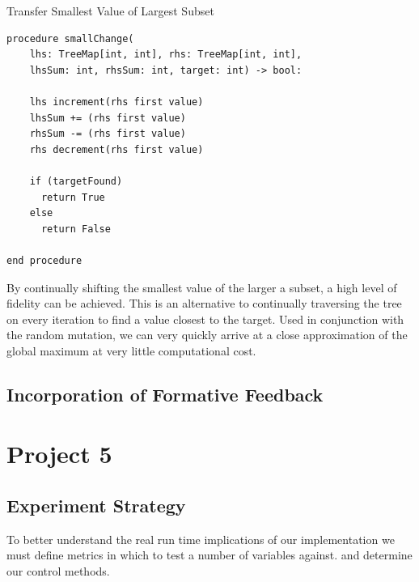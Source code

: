 \documentclass[a4paper]{article}
\begin{document}
\makeatletter
\renewcommand{\ALG@name}{Small Change}
\makeatother
\setcounter{algorithm}{0}


\begin{algorithm}
\caption{Transfer Smallest Value of Largest Subset}\label{euclid}

\begin{verbatim}
procedure smallChange(
    lhs: TreeMap[int, int], rhs: TreeMap[int, int], 
    lhsSum: int, rhsSum: int, target: int) -> bool:

    lhs increment(rhs first value)
    lhsSum += (rhs first value)
    rhsSum -= (rhs first value)
    rhs decrement(rhs first value)
    
    if (targetFound)
      return True
    else
      return False 
    
end procedure
\end{verbatim}
\end{algorithm}

By continually shifting the smallest value of the larger a subset, 
a high level of fidelity can be achieved. This is an alternative to 
continually traversing the tree on every iteration to find a value closest to 
the target. Used in conjunction with the random mutation, we can very quickly arrive at a close 
approximation of the global maximum at very little computational cost. 


\subsection{Incorporation of Formative Feedback}

\newpage


\section{Project 5}

\subsection{Experiment Strategy}
\vspace{8mm}
To better understand the real run time implications of our implementation 
we must define metrics in which to test a number of variables against. and determine
our control methods.\\
\end{document}
